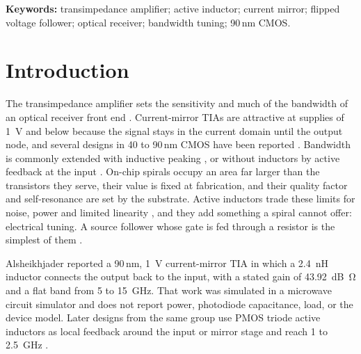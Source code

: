 \documentclass[11pt,a4paper]{article}
\begin{document}
\noindent\textbf{Keywords:} transimpedance amplifier; active inductor; current mirror; flipped voltage follower; optical receiver; bandwidth tuning; 90\,nm CMOS.

\section{Introduction}
The transimpedance amplifier sets the sensitivity and much of the bandwidth of an optical receiver front end \cite{razavi,sackinger}. Current-mirror TIAs are attractive at supplies of \SI{1}{V} and below because the signal stays in the current domain until the output node, and several designs in 40 to 90\,nm CMOS have been reported \cite{zohoori,hassan,atef,issa,alyas,shaaban}. Bandwidth is commonly extended with inductive peaking \cite{mohanbw}, or without inductors by active feedback at the input \cite{luactive,taghavi}. On-chip spirals occupy an area far larger than the transistors they serve, their value is fixed at fabrication, and their quality factor and self-resonance are set by the substrate. Active inductors trade these limits for noise, power and limited linearity \cite{yuan,sackingerla}, and they add something a spiral cannot offer: electrical tuning. A source follower whose gate is fed through a resistor is the simplest of them \cite{razaviai}.

Alsheikhjader \cite{baseline} reported a 90\,nm, \SI{1}{V} current-mirror TIA in which a \SI{2.4}{nH} inductor connects the output back to the input, with a stated gain of \SI{43.92}{dB\ohm} and a flat band from 5 to \SI{15}{GHz}. That work was simulated in a microwave circuit simulator and does not report power, photodiode capacitance, load, or the device model. Later designs from the same group use PMOS triode active inductors as local feedback around the input or mirror stage and reach 1 to \SI{2.5}{GHz} \cite{alberwari,issa,alyas}.
\end{document}
